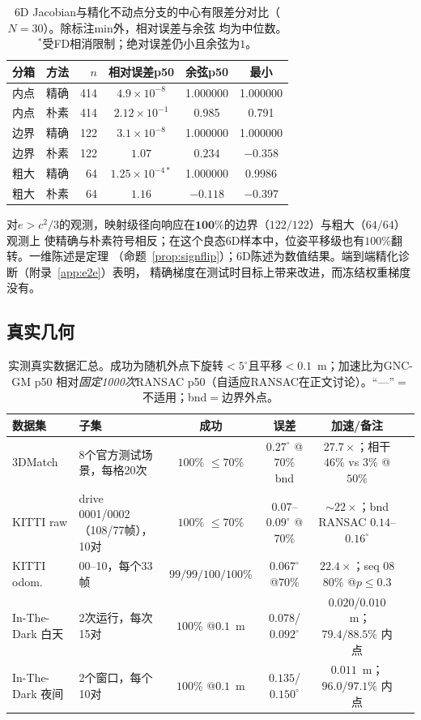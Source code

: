 \begin{table}[t]
\caption{6D Jacobian与精化不动点分支的中心有限差分对比（$N=30$）。除标注min外，相对误差与余弦
均为中位数。$^\ast$受FD相消限制；绝对误差仍小且余弦为$1$。}
\label{tab:gradient}
\centering
\footnotesize
\setlength{\tabcolsep}{2.5pt}
\begin{tabular}{llrccc}
\toprule
分箱 & 方法 & $n$ & 相对误差p50 & 余弦p50 & 最小 \\
\midrule
内点   & 精确 & 414 & $4.9\times10^{-8}$ & 1.000000 & 1.000000 \\
内点   & 朴素 & 414 & $2.12\times10^{-1}$ & 0.985 & 0.791 \\
边界 & 精确 & 122 & $3.1\times10^{-8}$ & 1.000000 & 1.000000 \\
边界 & 朴素 & 122 & $\mathbf{1.07}$ & $\mathbf{0.234}$ & $\mathbf{-0.358}$ \\
粗大    & 精确 & 64  & $1.25\times10^{-4\ast}$ & 1.000000 & 0.9986 \\
粗大    & 朴素 & 64  & $1.16$ & $-0.118$ & $-0.397$ \\
\bottomrule
\end{tabular}
\end{table}

对$e>c^2/3$的观测，映射级径向响应在$\mathbf{100\%}$的边界（$122/122$）与粗大（$64/64$）观测上
使精确与朴素符号相反；在这个良态6D样本中，位姿平移级也有$100\%$翻转。一维陈述是定理
（命题~\ref{prop:signflip}）；6D陈述为数值结果。端到端精化诊断（附录~\ref{app:e2e}）表明，
精确梯度在测试时目标上带来改进，而冻结权重梯度没有。

\subsection{真实几何}

\begin{table}[t]
\caption{实测真实数据汇总。成功为随机外点下旋转$<5^\circ$且平移$<0.1$~m；加速比为GNC-GM p50
相对\emph{固定1000次}RANSAC p50（自适应RANSAC在正文讨论）。“---”$=$不适用；bnd$=$边界外点。}
\label{tab:real}
\centering
\scriptsize
\setlength{\tabcolsep}{2.2pt}
\begin{tabular}{llcccc}
\toprule
数据集 & 子集 & 成功 & 误差 & 加速/备注 \\
\midrule
3DMatch & 8个官方测试场景，每格20次 & $100\%$ $\le70\%$ & $0.27^\circ$ @$70\%$ bnd &
$27.7\times$；相干$46\%$ vs $3\%$ @$50\%$ \\
KITTI raw & drive 0001/0002（108/77帧），10对 & $100\%$ $\le70\%$ &
$0.07$--$0.09^\circ$ @$70\%$ & $\sim22\times$；bnd RANSAC $0.14$--$0.16^\circ$ \\
KITTI odom. & 00--10，每个33帧 & $99/99/100/100\%$ & $0.067^\circ$ @$70\%$ &
$22.4\times$；seq 08 $80\%$ @$p\le0.3$ \\
In-The-Dark 白天 & 2次运行，每次15对 & $100\%$ @$0.1$~m & $0.078$/$0.092^\circ$ &
$0.020$/$0.010$~m；$79.4/88.5\%$ 内点 \\
In-The-Dark 夜间 & 2个窗口，每个10对 & $100\%$ @$0.1$~m & $0.135$/$0.150^\circ$ &
$0.011$~m；$96.0/97.1\%$ 内点 \\
\bottomrule
\end{tabular}
\end{table}

